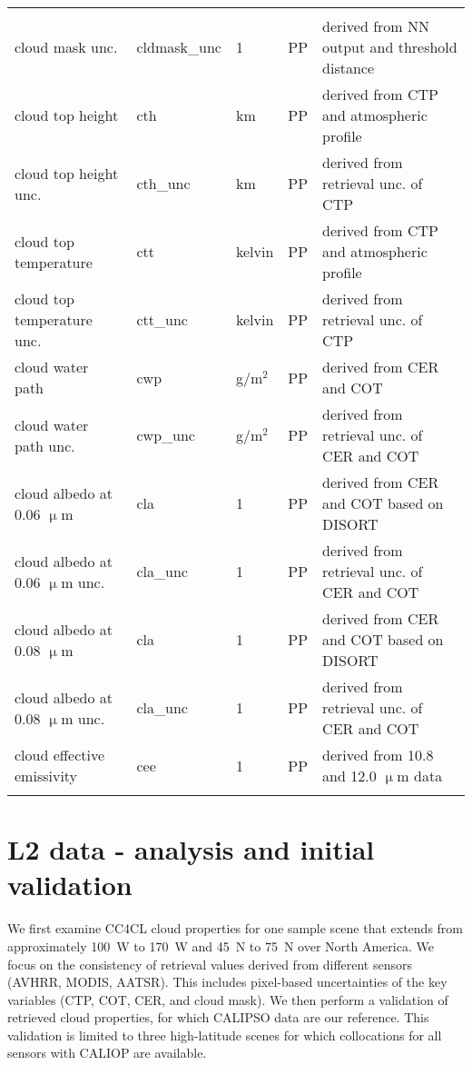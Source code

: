 \begin{table*}[h]
\begin{tabular}{l|l|l|l|l}
    \middlehline
    \multicolumn{5}{c}{secondary variables} \\
    \middlehline
    cloud mask unc. & cldmask\_unc & 1 & PP & derived from NN output and threshold distance \\
    cloud top height & cth & km & PP & derived from CTP and atmospheric profile \\
    cloud top height unc. & cth\_unc & km & PP & derived from retrieval unc. of CTP \\
    cloud top temperature & ctt & kelvin & PP & derived from CTP and atmospheric profile \\
    cloud top temperature unc. & ctt\_unc & kelvin & PP & derived from retrieval unc. of CTP \\
    cloud water path & cwp & g/m$^2$ & PP & derived from CER and COT \citep{Nakajima90} \\
    cloud water path unc. & cwp\_unc & g/m$^2$ & PP & derived from retrieval unc. of CER and COT \\
    cloud albedo at 0.06 $\upmu$m & cla & 1 & PP & derived from CER and COT based on DISORT \citep{DISORT} \\
    cloud albedo at 0.06 $\upmu$m unc. & cla\_unc & 1 & PP & derived from retrieval unc. of CER and COT \\
    cloud albedo at 0.08 $\upmu$m & cla & 1 & PP & derived from CER and COT based on DISORT \\
    cloud albedo at 0.08 $\upmu$m unc. & cla\_unc & 1 & PP & derived from retrieval unc. of CER and COT \\
    cloud effective emissivity & cee & 1 & PP & derived from 10.8 and 12.0 $\upmu$m data \\
    \bottomhline
  \end{tabular}
  \label{tab:L2_variables}
\end{table*}

\section{L2 data - analysis and initial validation}\label{L2_data}

We first examine CC4CL cloud properties for one sample scene that extends from approximately 100\textdegree\ W to 170\textdegree\ W and 45\textdegree\ N to 75\textdegree\ N over North America. We focus on the consistency of retrieval values derived from different sensors (AVHRR, MODIS, AATSR). This includes pixel-based uncertainties of the key variables (CTP, COT, CER, and cloud mask). We then perform a validation of retrieved cloud properties, for which CALIPSO data are our reference. This validation is limited to three high-latitude scenes for which collocations for all sensors with CALIOP are available.

